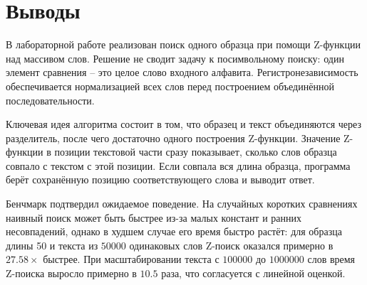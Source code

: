 \section{Выводы}

В лабораторной работе реализован поиск одного образца при помощи Z-функции над массивом слов.
Решение не сводит задачу к посимвольному поиску: один элемент сравнения -- это целое слово входного
алфавита. Регистронезависимость обеспечивается нормализацией всех слов перед построением объединённой
последовательности.

Ключевая идея алгоритма состоит в том, что образец и текст объединяются через разделитель, после чего
достаточно одного построения Z-функции. Значение Z-функции в позиции текстовой части сразу показывает,
сколько слов образца совпало с текстом с этой позиции. Если совпала вся длина образца, программа берёт
сохранённую позицию соответствующего слова и выводит ответ.

Бенчмарк подтвердил ожидаемое поведение. На случайных коротких сравнениях наивный поиск может быть
быстрее из-за малых констант и ранних несовпадений, однако в худшем случае его время быстро растёт:
для образца длины 50 и текста из \(50000\) одинаковых слов Z-поиск оказался примерно в
\(27.58\times\) быстрее. При масштабировании текста с \(100000\) до \(1000000\) слов время Z-поиска
выросло примерно в \(10.5\) раза, что согласуется с линейной оценкой.
\pagebreak
